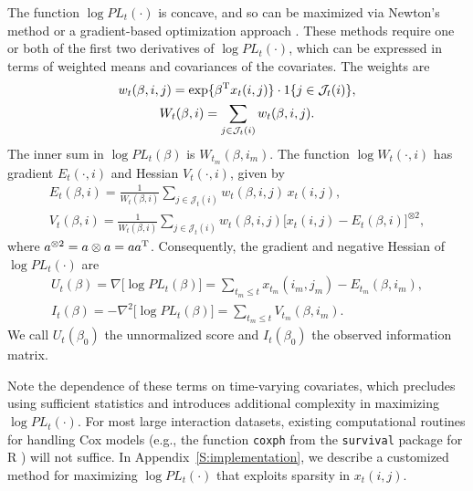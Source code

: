 \documentclass[final]{statsoc}
\begin{document}
The function $\log \mathit{PL}_t(\cdot)$ is concave, and so can be maximized
via Newton's method or a gradient-based optimization approach
\citep{nocedal2006numerical}.  These methods require one or both of the
first two derivatives of $\log\mathit{PL}_t(\cdot)$, which can be
expressed in terms of weighted means and covariances of the covariates.  The
weights are
\begin{subequations}
\begin{gather}
    w_{t}(\beta, i,j)
        =
        \exp\{ \beta^{\mathrm{T}} x_t(i,j) \}
        \cdot
        1\{ j \in \mathcal{J}_t(i)\}, \\
    W_{t}(\beta, i)
        =
        \sum_{j \in \mathcal{J}_t(i)} w_{t}(\beta, i,j).
\end{gather}
\end{subequations}
The inner sum in $\log \mathit{PL}_t(\beta)$ is
$W_{t_m}\!(\beta, i_m)$.  The function
$\log W_{t}(\cdot, i)$ has gradient $E_{t}(\cdot, i)$ and Hessian
$V_{t}(\cdot, i)$, given by
\begin{subequations}
\begin{gather}
    E_{t}(\beta, i)
        =
        \frac{1}{W_{t}(\beta, i)}
        \sum_{j \in \mathcal{J}_t(i)}
            w_{t}(\beta, i,j) \, x_{t}(i,j), \label{E:wt-expectation}\\
    V_{t}(\beta, i)
        =
        \frac{1}{W_{t}(\beta, i)}
        \sum_{j \in \mathcal{J}_t(i)}
            w_{t}(\beta, i,j)
            \Big[ x_{t}(i,j) - E_{t}(\beta, i)\Big]^{\otimes 2},
\end{gather}
\end{subequations}
where $a^{\otimes 2} = a \otimes a = a a^{\mathrm{T}}$.
Consequently, the gradient and negative Hessian of
$\log \mathit{PL}_t(\cdot)$ are
\begin{subequations}
\begin{gather}
    \label{E:log-pl-gradient}
    U_t(\beta)
        =
        \nabla \big[ \log \mathit{PL}_t(\beta) \big]
        =
        \sum_{t_m \leq t}
            x_{t_m}(i_m, j_m) - E_{t_m}(\beta, i_m), \\
    \label{E:log-pl-neg-hessian}
    I_t(\beta)
        =
        -\nabla^2 \big[ \log \mathit{PL}_t(\beta) \big]
        =
        \sum_{t_m \leq t}
            V_{t_m}(\beta, i_m).
\end{gather}
\end{subequations}
We call $U_t(\beta_0)$ the unnormalized score and $I_t(\beta_0)$
the observed information matrix.

Note the dependence of these terms on time-varying covariates,
which precludes using sufficient statistics and introduces
additional complexity in maximizing $\log \mathit{PL}_t(\cdot)$.
For most large interaction datasets,
existing computational routines for handling Cox models
(e.g., the function \texttt{coxph} from the \texttt{survival}
package for R \citep{therneau2009survival}) will not suffice.  In
Appendix~\ref{S:implementation}, we describe a customized method for
maximizing $\log \mathit{PL}_t(\cdot)$ that exploits sparsity in
$x_t(i,j)$.
\end{document}
